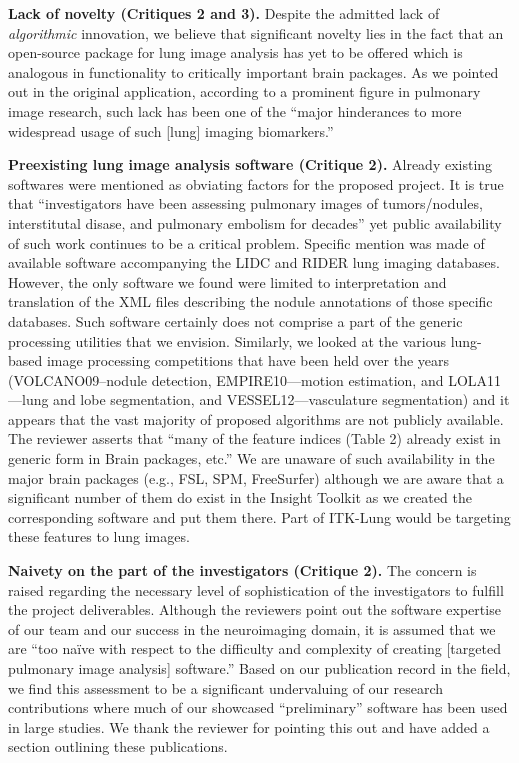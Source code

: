 \documentclass[11pt,]{article}
\begin{document}
\textbf{Lack of novelty (Critiques 2 and 3).} Despite the admitted lack
of \emph{algorithmic} innovation, we believe that significant novelty
lies in the fact that an open-source package for lung image analysis has
yet to be offered which is analogous in functionality to critically
important brain packages. As we pointed out in the original application,
according to a prominent figure in pulmonary image research, such lack
has been one of the ``major hinderances to more widespread usage of such
{[}lung{]} imaging biomarkers.''

\textbf{Preexisting lung image analysis software (Critique 2).} Already
existing softwares were mentioned as obviating factors for the proposed
project. It is true that ``investigators have been assessing pulmonary
images of tumors/nodules, interstitutal disase, and pulmonary embolism
for decades'' yet public availability of such work continues to be a
critical problem. Specific mention was made of available software
accompanying the LIDC and RIDER lung imaging databases. However, the
only software we found were limited to interpretation and translation of
the XML files describing the nodule annotations of those specific
databases. Such software certainly does not comprise a part of the
generic processing utilities that we envision. Similarly, we looked at
the various lung-based image processing competitions that have been held
over the years (VOLCANO09--nodule detection, EMPIRE10---motion
estimation, and LOLA11---lung and lobe segmentation, and
VESSEL12---vasculature segmentation) and it appears that the vast
majority of proposed algorithms are not publicly available. The reviewer
asserts that ``many of the feature indices (Table 2) already exist in
generic form in Brain packages, etc.'' We are unaware of such
availability in the major brain packages (e.g., FSL, SPM, FreeSurfer)
although we are aware that a significant number of them do exist in the
Insight Toolkit as we created the corresponding software and put them
there. Part of ITK-Lung would be targeting these features to lung
images.

\textbf{Naivety on the part of the investigators (Critique 2).} The
concern is raised regarding the necessary level of sophistication of the
investigators to fulfill the project deliverables. Although the
reviewers point out the software expertise of our team and our success
in the neuroimaging domain, it is assumed that we are ``too naïve with
respect to the difficulty and complexity of creating {[}targeted
pulmonary image analysis{]} software.'' Based on our publication record
in the field, we find this assessment to be a significant undervaluing
of our research contributions where much of our showcased
``preliminary'' software has been used in large studies. We thank the
reviewer for pointing this out and have added a section outlining these
publications.
\end{document}
